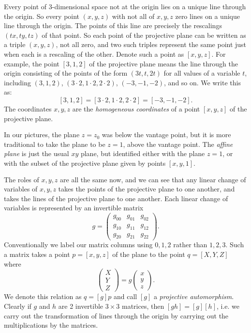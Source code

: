 Every point of 3-dimensional space not at the origin lies on a unique line through the origin.
So every point \((x,y,z)\) with not all of \(x,y,z\) zero lines on a unique line through the origin.
The points of this line are precisely the rescalings \((tx,ty,tz)\) of that point.
So each point of the projective plane can be written as a triple \((x,y,z)\), not all zero, and two such triples represent the same point just when each is a rescaling of the other.
Denote such a point as \([x,y,z]\).
For example, the point \([3,1,2]\) of the projective plane means the line through the origin consisting of the points of the form \((3t,t,2t)\) for all values of a variable \(t\), including \((3,1,2)\), \((3 \cdot 2, 1 \cdot 2, 2 \cdot 2)\), \((-3,-1,-2)\), and so on.
We write this as:
\[
[3,1,2]=[3 \cdot 2, 1 \cdot 2, 2 \cdot 2]=[-3,-1,-2].
\]
The coordinates \(x,y,z\) are the \emph{homogeneous coordinates} of a point \([x,y,z]\) of the projective plane.

In our pictures, the plane \(z=z_0\) was below the vantage point, but it is more traditional to take the plane to be \(z=1\), above the vantage point.
The \emph{affine plane} is just the usual \(xy\) plane, but identified either with the plane \(z=1\), or with the subset of the projective plane given by points \([x,y,1]\).

The roles of \(x,y,z\) are all the same now, and we can see that any linear change of variables of \(x,y,z\) takes the points of the projective plane to one another, and takes the lines of the projective plane to one another.
Each linear change of variables is represented by an invertible matrix
\[
g=
\begin{pmatrix}
g_{00} & g_{01} & g_{02} \\
g_{10} & g_{11} & g_{12} \\
g_{20} & g_{21} & g_{22}
\end{pmatrix}.
\]
Conventionally we label our matrix columns using \(0,1,2\) rather than \(1,2,3\).
Such a matrix takes a point \(p=[x,y,z]\) of the plane to the point \(q=[X,Y,Z]\) where
\[
\begin{pmatrix}
X \\
Y \\
Z
\end{pmatrix}
=
g
\begin{pmatrix}
x \\
y \\
z
\end{pmatrix}.
\]
We denote this relation as \(q=[g]p\) and call \([g]\) a \emph{projective automorphism}.
Clearly if \(g\) and \(h\) are 2 invertible \(3 \times 3\) matrices, then \([gh]=[g][h]\), i.e. we carry out the transformation of lines through the origin by carrying out the multiplications by the matrices.

